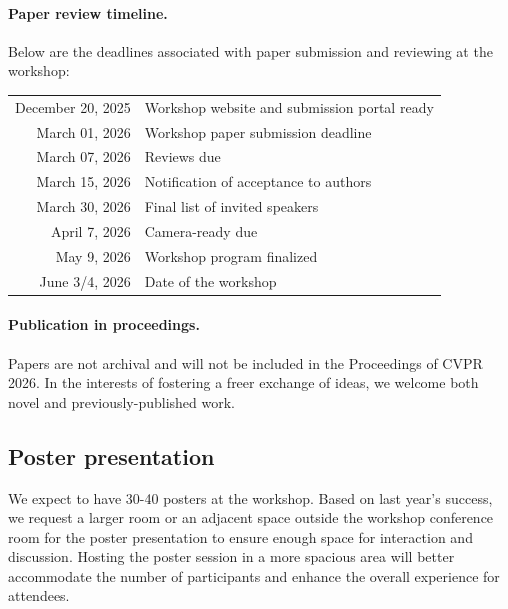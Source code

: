 \documentclass{article}
\begin{document}
\paragraph{Paper review timeline.}
Below are the deadlines associated with paper submission and reviewing at the workshop:

\begin{tabular}{rl}
    \\
    December 20, 2025 & Workshop website and submission portal ready \\
    March 01, 2026 & Workshop paper submission deadline \\
    March 07, 2026 & Reviews due \\
    March 15, 2026 & Notification of acceptance to authors \\
    March 30, 2026 & Final list of invited speakers \\
    April 7, 2026 & Camera-ready due \\
    May 9, 2026 & Workshop program finalized \\
    June 3/4, 2026 & Date of the workshop \\
\end{tabular}


\paragraph{Publication in proceedings.}
Papers are not archival and will not be included in the Proceedings of CVPR 2026. In the interests of fostering a freer exchange of ideas, we welcome both novel and previously-published work.


\subsection{Poster presentation}
We expect to have 30-40 posters at the workshop. Based on last year’s success, we request a larger room or an adjacent space outside the workshop conference room for the poster presentation to ensure enough space for interaction and discussion. Hosting the poster session in a more spacious area will better accommodate the number of participants and enhance the overall experience for attendees.



\end{document}

